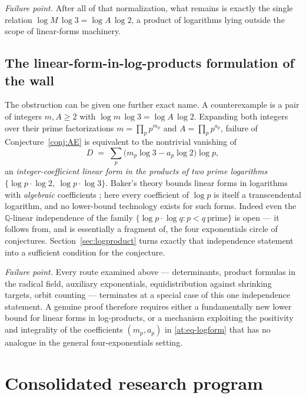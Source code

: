 \documentclass[11pt,oneside]{article}
\theoremstyle{definition}
\theoremstyle{remark}
\newcommand{\Q}{\mathbb Q}
\begin{document}
\emph{Failure point.}  After all of that normalization, what remains is exactly the single
relation $\log M\,\log3=\log A\,\log2$, a product of logarithms lying outside the scope of
linear-forms machinery.

\subsection{The linear-form-in-log-products formulation of the wall}
\label{at:logproduct}

The obstruction can be given one further exact name.  A counterexample is a pair of integers
$m,A\ge2$ with $\log m\,\log3=\log A\,\log2$.  Expanding both integers over their prime
factorizations $m=\prod_pp^{m_p}$ and $A=\prod_pp^{a_p}$, failure of Conjecture~\ref{conj:AE}
is equivalent to the nontrivial vanishing of
\begin{equation}
  D\;=\;\sum_{p}\bigl(m_p\log3-a_p\log2\bigr)\log p,
  \label{at:eq-logform}
\end{equation}
an \emph{integer-coefficient linear form in the products of two prime logarithms}
$\{\log p\cdot\log2,\ \log p\cdot\log3\}$.  Baker's theory bounds linear forms in logarithms
with \emph{algebraic} coefficients \cite{Baker1975}; here every coefficient of $\log p$ is
itself a transcendental logarithm, and no lower-bound technology exists for such forms.
Indeed even the $\Q$-linear independence of the family
$\{\log p\cdot\log q:p<q\ \text{prime}\}$ is open --- it follows from, and is essentially a
fragment of, the four exponentials circle of conjectures.  Section~\ref{sec:logproduct}
turns exactly that independence statement into a sufficient condition for the conjecture.

\emph{Failure point.}  Every route examined above --- determinants, product formulas in the
radical field, auxiliary exponentials, equidistribution against shrinking targets, orbit
counting --- terminates at a special case of this one independence statement.  A genuine
proof therefore requires either a fundamentally new lower bound for linear forms in
log-products, or a mechanism exploiting the positivity and integrality of the coefficients
$(m_p,a_p)$ in \eqref{at:eq-logform} that has no analogue in the general four-exponentials
setting.

\section{Consolidated research program}
\label{sec:program}
\end{document}
